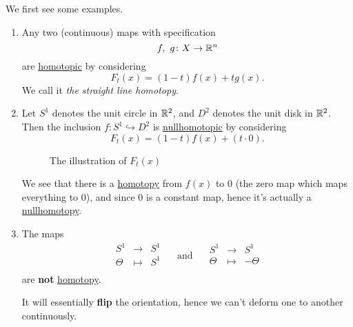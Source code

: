 \begin{eg}
	We first see some examples.
	\begin{enumerate}
		\item \label{eg:lec1:straight-line-homotopy} Any two (continuous) maps with specification
		      \[
			      f,\ g\colon X\to \mathbb{\MakeUppercase{R}}^n
		      \]
		      are \hyperref[def:homotopic]{homotopic} by considering
		      \[
			      F_{t}(x) = (1 - t)f(x) + t g(x).
		      \]
		      We call it \emph{the straight line homotopy}.
		\item Let \(S^1\) denotes the unit circle in \(\mathbb{\MakeUppercase{R}} ^2\), and
		      \(D^2\)  denotes the unit disk in \(\mathbb{\MakeUppercase{R}} ^2\). Then the inclusion
		      \(f\colon S^1\hookrightarrow D^2\) is \hyperref[def:nullhomotopic]{nullhomotopic} by considering
		      \[
			      F_t(x) = (1 - t)f(x) + (t\cdot 0).
		      \]
		      \begin{figure}[H]
			      \centering
			      \caption{The illustration of \(F_{t}(x)\)}
			      \label{fig:eg:homotopy}
		      \end{figure}
		      We see that there is a \hyperref[def:homotopy]{homotopy} from \(f(x)\) to \(0\) (the zero
		      map which maps everything to \(0\)), and since \(0\) is a constant map, hence it's actually
		      a \hyperref[def:nullhomotopic]{nullhomotopy}.
		\item The maps
		      \[
			      \begin{array}{ccc}
				      S^1    & \to     & S^1 \\
				      \Theta & \mapsto & S^1 \\
			      \end{array}\quad \text{ and } \quad
			      \begin{array}{ccc}
				      S^1    & \to     & S^1     \\
				      \Theta & \mapsto & -\Theta \\
			      \end{array}
		      \]
		      are \textbf{not} \hyperref[def:homotopy]{homotopy}.
		      \begin{remark}
			      It will essentially \textbf{flip} the orientation, hence we can't deform one to another continuously.
		      \end{remark}
	\end{enumerate}
\end{eg}

